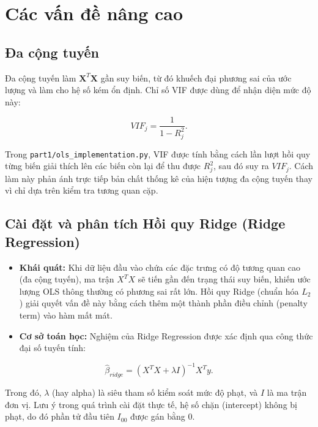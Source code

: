 \documentclass[12pt,a4paper]{article}
\begin{document}
\section{Các vấn đề nâng cao}
\subsection{Đa cộng tuyến}
Đa cộng tuyến làm $\mathbf{X}^T\mathbf{X}$ gần suy biến, từ đó khuếch đại phương sai của ước lượng và làm cho hệ số kém ổn định. Chỉ số VIF được dùng để nhận diện mức độ này:
\begin{formulabox}
\begin{equation}
    VIF_j = \frac{1}{1-R_j^2}.
\end{equation}
\end{formulabox}

Trong \texttt{part1/ols\_implementation.py}, VIF được tính bằng cách lần lượt hồi quy từng biến giải thích lên các biến còn lại để thu được $R_j^2$, sau đó suy ra $VIF_j$. Cách làm này phản ánh trực tiếp bản chất thống kê của hiện tượng đa cộng tuyến thay vì chỉ dựa trên kiểm tra tương quan cặp.

\subsection{Cài đặt và phân tích Hồi quy Ridge (Ridge Regression)}
\begin{itemize}
    \item \textbf{Khái quát:} Khi dữ liệu đầu vào chứa các đặc trưng có độ tương quan cao (đa cộng tuyến), ma trận $X^TX$ sẽ tiến gần đến trạng thái suy biến, khiến ước lượng OLS thông thường có phương sai rất lớn. Hồi quy Ridge (chuẩn hóa $L_2$) giải quyết vấn đề này bằng cách thêm một thành phần điều chỉnh (penalty term) vào hàm mất mát.

    \item \textbf{Cơ sở toán học:} Nghiệm của Ridge Regression được xác định qua công thức đại số tuyến tính:
\end{itemize}

\begin{formulabox}
\begin{equation}
    \hat{\beta}_{ridge} = (X^T X + \lambda I)^{-1}X^T y.
\end{equation}
\end{formulabox}

\noindent Trong đó, $\lambda$ (hay alpha) là siêu tham số kiểm soát mức độ phạt, và $I$ là ma trận đơn vị. Lưu ý trong quá trình cài đặt thực tế, hệ số chặn (intercept) không bị phạt, do đó phần tử đầu tiên $I_{00}$ được gán bằng 0.
\end{document}
